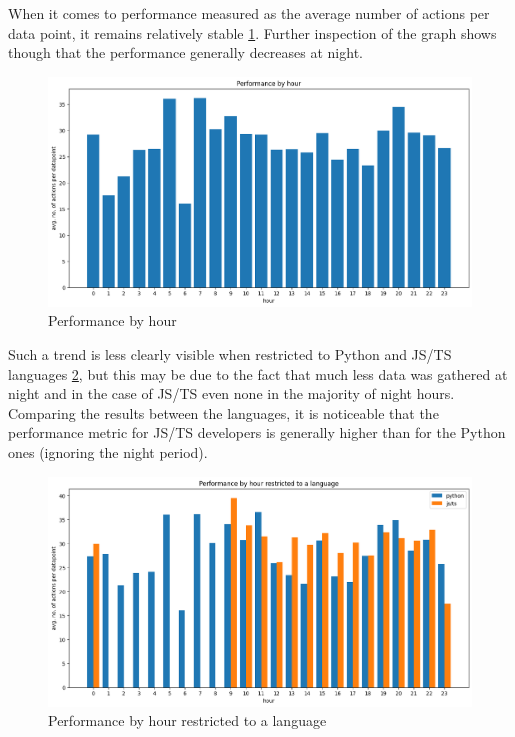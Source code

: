 When it comes to performance measured as the average number of actions per data point, it remains relatively stable \ref{fig:performance_by_hour}. Further inspection of the graph shows though that the performance generally decreases at night.

\begin{figure}[htbp]
  \centering
  \includegraphics[scale=0.5]{chapters/results/graphics/performance-by-hour.png}
  \caption{Performance by hour}
  \label{fig:performance_by_hour}
\end{figure}

Such a trend is less clearly visible when restricted to Python and JS/TS languages \ref{fig:performance_by_hour_langs}, but this may be due to the fact that much less data was gathered at night and in the case of JS/TS even none in the majority of night hours. Comparing the results between the languages, it is noticeable that the performance metric for JS/TS developers is generally higher than for the Python ones (ignoring the night period).

\begin{figure}[htbp]
  \centering
  \includegraphics[scale=0.5]{chapters/results/graphics/performance-by-hour-langs.png}
  \caption{Performance by hour restricted to a language}
  \label{fig:performance_by_hour_langs}
\end{figure}
